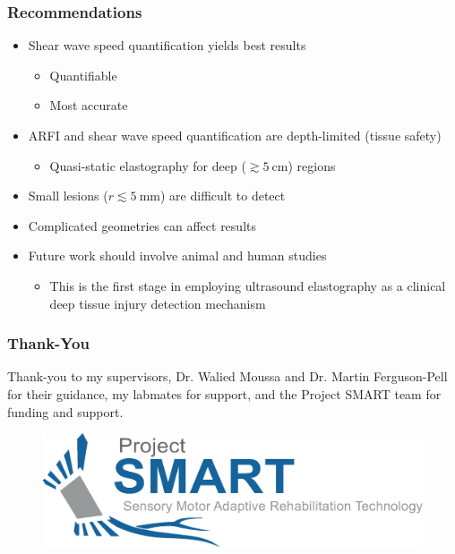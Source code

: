 \documentclass{beamer}
\begin{document}
		\begin{frame}
			\frametitle{Recommendations}
			\begin{itemize}
				\item \alert{Shear wave speed quantification} yields best results
				\begin{itemize}
					\item Quantifiable
					\item Most accurate
				\end{itemize}
				\item ARFI and shear wave speed quantification are depth-limited (tissue safety)
				\begin{itemize}
					\item Quasi-static elastography for deep ($\gtrsim \SI{5}{\cm}$) regions
				\end{itemize}
				\item Small lesions ($r \lesssim \SI{5}{\mm}$) are difficult to detect
				\item Complicated geometries can affect results
				\item Future work should involve \alert{animal} and \alert{human} studies
				\begin{itemize}
					\item This is the first stage in employing ultrasound elastography as a clinical deep tissue injury detection mechanism
				\end{itemize}
			\end{itemize}
		\end{frame}
		
		\begin{frame}
			\frametitle{Thank-You}
			\vspace{1cm}
			Thank-you to my supervisors, \alert{Dr. Walied Moussa} and \alert{Dr. Martin Ferguson-Pell} for their guidance, my labmates for support, and the Project SMART team for funding and support.
			\vspace{1cm}
			\begin{figure}
				\includegraphics[width=\textwidth]{assets/SMART.eps}
			\end{figure}
		\end{frame}
\end{document}
